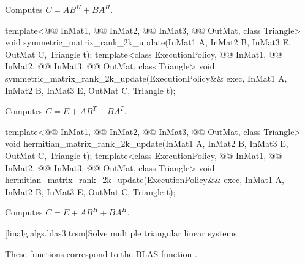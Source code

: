 \begin{itemdescr}
\pnum
\effects
Computes $C = A B^H + B A^H$.
\end{itemdescr}

%
\begin{itemdecl}
template<@@ InMat1, @@ InMat2, @@ InMat3,
         @@ OutMat, class Triangle>
void symmetric_matrix_rank_2k_update(InMat1 A, InMat2 B, InMat3 E, OutMat C, Triangle t);
template<class ExecutionPolicy, @@ InMat1, @@ InMat2, @@ InMat3,
         @@ OutMat, class Triangle>
void symmetric_matrix_rank_2k_update(ExecutionPolicy&& exec,
                                     InMat1 A, InMat2 B, InMat3 E, OutMat C, Triangle t);
\end{itemdecl}

\begin{itemdescr}
\pnum
\effects
Computes $C = E + A B^T + B A^T$.
\end{itemdescr}

%
\begin{itemdecl}
template<@@ InMat1, @@ InMat2, @@ InMat3, @@ OutMat,
         class Triangle>
void hermitian_matrix_rank_2k_update(InMat1 A, InMat2 B, InMat3 E, OutMat C, Triangle t);
template<class ExecutionPolicy, @@ InMat1, @@ InMat2, @@ InMat3,
         @@ OutMat,
         class Triangle>
void hermitian_matrix_rank_2k_update(ExecutionPolicy&& exec, InMat1 A, InMat2 B, InMat3 E,
                                     OutMat C, Triangle t);
\end{itemdecl}

\begin{itemdescr}
\pnum
\effects
Computes $C = E + A B^H + B A^H$.
\end{itemdescr}

[linalg.algs.blas3.trsm]{Solve multiple triangular linear systems}

\pnum
\begin{note}
These functions correspond to the BLAS function \supercite{blas3}.
\end{note}

